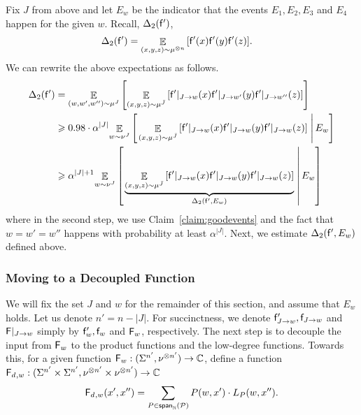 \documentclass[10pt,a4paper]{amsart}
\newcommand\cExpect[3]{{\mathop{\mathbb{E}}_{#1}\left[ \left. #3 \;\right\vert #2 \right]}}
\newcommand\Expect[2]{{\mathop{\mathbb{E}}_{#1}\left[ {#2} \right]}}
\newcommand\spn{{\sf span}_{\mathbb{N}}}
\renewcommand\geq{\geqslant}
\newcommand{\V}[1]{{#1}}
\begin{document}
    Fix $J$ from above and let $E_{\V w}$ be the indicator that the events $E_1 , E_2, E_3 $ and $E_4$ happen for the given $\V w$. Recall, $\Delta_2(\mathsf{f}')$,
    \begin{align*}
    \Delta_2(\noisyfrefined) &=\Expect{(\V x, \V y, \V z)\sim \mu^{\otimes n}}{\noisyfrefined(\V x) \noisyfrefined(\V y) \noisyfrefined(\V z)}.
    \end{align*}
%
We can rewrite the above expectations as follows.
    \begin{align*}
     \Delta_2(\noisyfrefined) &=  \Expect{(\V w, \V w', \V w'') \sim \mu^{J}}{\Expect{(\V x, \V y, \V z)\sim \mu^{\bar{J}}}{\noisyfrefined|_{J\rightarrow \V w}(\V x) \noisyfrefined|_{J\rightarrow \V w'}(\V y) \noisyfrefined|_{J\rightarrow \V w''}(\V z)}}\\
     & \geq 0.98\cdot \alpha^{|J|} \cExpect{w\sim\nu^{J}}{E_w}{\Expect{(\V x, \V y, \V z)\sim \mu^{\bar{J}}}{\noisyfrefined|_{J\rightarrow \V w}(\V x) \noisyfrefined|_{J\rightarrow \V w}(\V y) \noisyfrefined|_{J\rightarrow \V w}(\V z)}}\\
       & \geq \alpha^{|J|+1} \cExpect{w\sim\nu^{J}}{E_w}{\underbrace{\Expect{(\V x, \V y, \V z)\sim \mu^{\bar{J}}}{\noisyfrefined|_{J\rightarrow \V w}(\V x) \noisyfrefined|_{J\rightarrow \V w}(\V y) \noisyfrefined|_{J\rightarrow \V w}(\V z)}}_{\Delta_2(\noisyfrefined, E_{\V w}) }}\\
    \end{align*}
   where in the second step, we use Claim~\ref{claim:goodevents} and the fact that $\V w = \V w' = \V w''$ happens with probability at least $\alpha^{|J|}$.  Next, we estimate $\Delta_2(\noisyfrefined, E_{\V w})$ defined above.
   
\subsubsection{Moving to a Decoupled Function}
\label{sec:move_to_decoulped}
We will fix the set $J$ and $\V w$ for the remainder of this section, and assume that $E_w$ holds.  Let us denote $n' = n-|J|$. For succinctness, we denote $\noisyfrefined_{J\rightarrow\V w}, \noisyfcoarse_{J\rightarrow\V w}$ and $\fcoarsedecomposed|_{J\rightarrow \V w}$ simply by $\noisyfrefined_{\V w}, \noisyfcoarse_{\V w}$ and $\fcoarsedecomposed_{\V w}$, respectively. The next step is to decouple the input from $\fcoarsedecomposed_{\V w}$ to the product functions and the low-degree functions. Towards this, for a given function $\fcoarsedecomposed_{\V w} : (\Sigma^{n'}, \nu^{\otimes n'}) \rightarrow \mathbb{C}$, define a function $\fcoarsedecoupled_{,\V w}: (\Sigma^{n'}\times \Sigma^{n'},  \nu^{\otimes n'}\times  \nu^{\otimes n'}) \rightarrow \mathbb{C}$
$$\fcoarsedecoupled_{, \V w}(\V x', \V x'') = \sum\limits_{P\in\spn(\mathcal{P})} P(\V w, \V x') \cdot L_P(\V w, \V x'').$$
\end{document}
